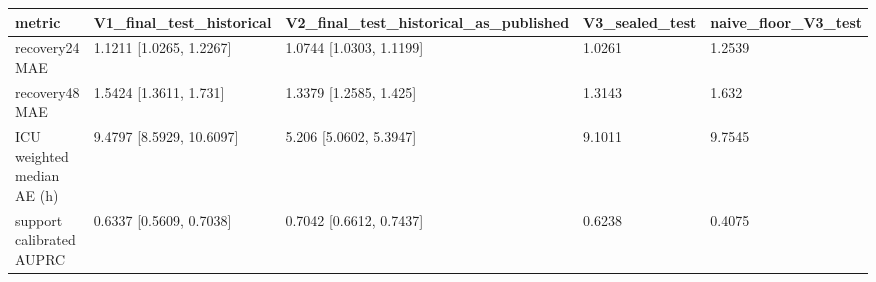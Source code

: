 \begin{tabular}{lllll}
\hline
metric & V1\_final\_test\_historical & V2\_final\_test\_historical\_as\_published & V3\_sealed\_test & naive\_floor\_V3\_test \\
\hline
recovery24 MAE & 1.1211 [1.0265, 1.2267] & 1.0744 [1.0303, 1.1199] & 1.0261 & 1.2539 \\
recovery48 MAE & 1.5424 [1.3611, 1.731] & 1.3379 [1.2585, 1.425] & 1.3143 & 1.632 \\
ICU weighted median AE (h) & 9.4797 [8.5929, 10.6097] & 5.206 [5.0602, 5.3947] & 9.1011 & 9.7545 \\
support calibrated AUPRC & 0.6337 [0.5609, 0.7038] & 0.7042 [0.6612, 0.7437] & 0.6238 & 0.4075 \\
\hline
\end{tabular}
